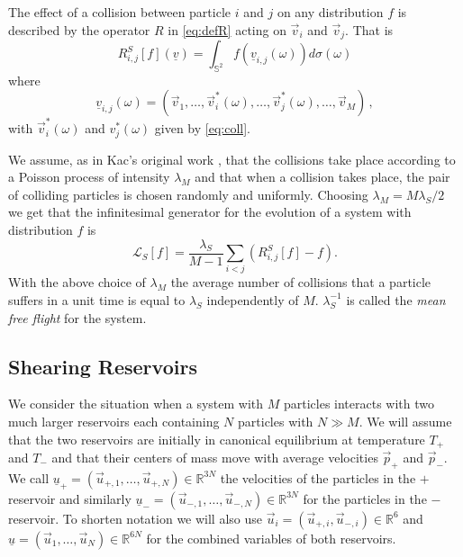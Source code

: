 \documentclass{article}
\newcommand*\R{ \mathds{R} }
\newcommand\uu{{\underline u}}
\newcommand\vu{{\vec u}}
\begin{document}
The effect of a collision between particle $i$ and $j$ on any distribution $f$ is described by the operator $R$
in \eqref{eq:defR} acting on $\vec v_i$ and $\vec v_j$. That is %
\begin{equation*}
	R_{i,j}^S[f](\underline v)=\int_{\mathds S^2}f(\underline v_{i,j}(\omega))d\sigma(\omega)
\end{equation*}
%
where 
%
\begin{equation*}
\underline v_{i,j}(\omega)=(\vec v_1,\ldots,\vec v_i^*(\omega),\ldots,\vec
v_j^*(\omega),\ldots,\vec v_M)\,,
\end{equation*}
%
with $\vec v_i^*(\omega)$ and $v_j^*(\omega)$ given by \eqref{eq:coll}.


We assume, as in Kac's original work \cite{Kac}, that the collisions take place according to a Poisson process of
intensity $\lambda_M$ and that when a collision takes place, the pair of colliding particles is chosen randomly and
uniformly. Choosing $\lambda_M=M\lambda_S/2$ we get that the infinitesimal generator for the evolution of a
system with distribution $f$ is %
\begin{equation}\label{eq:genLS}
\mathcal L_S[f]=\frac{\lambda_S}{M-1}\sum_{i<j} (R^S_{i,j}[f]-f).
\end{equation}
%
With the above choice of $\lambda_M$ the average number of collisions that a particle suffers in a unit time is equal to
$\lambda_S$ independently of $M$. $\lambda_S^{-1}$ is called the {\it mean free flight} for the system. %

\subsection{Shearing Reservoirs}\label{subsec:res}

We consider the situation when a system  with $M$ particles interacts with two much larger reservoirs each containing
$N$ particles with $N \gg M$. We will assume that the two reservoirs are initially in canonical equilibrium at
temperature $T_+$ and $T_-$ and that their centers of mass move with average velocities $\vec p_+$ and $\vec p_-$. We
call $\uu_+=(\vu_{+,1},\ldots, \vu_{+,N})\in \R^{3N}$ the velocities of the particles in the $+$ reservoir and similarly
$\uu_-=(\vu_{-,1},\ldots, \vu_{-,N})\in \R^{3N}$ for the particles in the $-$ reservoir. To shorten notation we will 
also use $\vu_i=(\vu_{+,i},\vu_{-,i})\in \R^6$ and $\uu=(\vu_{1},\ldots, \vu_{N})\in \R^{6N}$ for the combined 
variables of both reservoirs.
\end{document}
